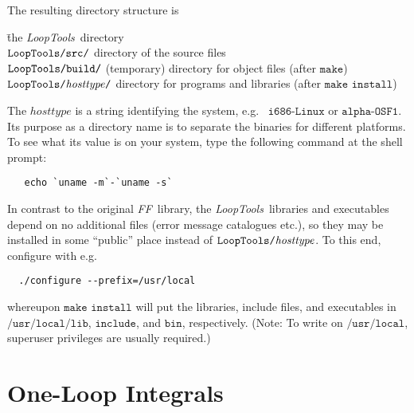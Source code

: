 \documentclass[twoside,12pt]{report}
\def\greyed#1{\special{ps: .7 setgray}#1\special{ps: 0 setgray}}
\def\FF{\textit{FF}}
\def\LT{\textit{LoopTools}}
\def\eg{e.g.\ }
\def\Code#1{\ensuremath{\texttt{#1}}}
\def\Var#1{\ensuremath{\mathit{#1}}}
\begin{document}
\pagebreak

The resulting directory structure is
\begin{tabbing}
\rlap{\Code{LoopTools/}}\hspace{.3\linewidth} \=
	the \LT\ directory \\
\Code{\greyed{LoopTools/}src/} \>
	directory of the source files \\
\Code{\greyed{LoopTools/}build/} \>
	(temporary) directory for object files (after \Code{make}) \\
\Code{\greyed{LoopTools/}\Var{hosttype}/} \>
	directory for programs and libraries (after \Code{make install}) 
\end{tabbing}

%
The \Var{hosttype} is a string identifying the system, \eg 
\Code{i686-Linux} or \Code{alpha-OSF1}.  Its purpose as a directory 
name is to separate the binaries for different platforms.  To see what 
its value is on your system, type the following command at the shell 
prompt:
\begin{verbatim}
   echo `uname -m`-`uname -s`
\end{verbatim}

In contrast to the original \FF\ library, the \LT\ libraries and
executables depend on no additional files (error message catalogues etc.),
so they may be installed in some ``public'' place instead of
\Code{LoopTools/\Var{hosttype}}.  To this end, configure with \eg
\begin{verbatim}
  ./configure --prefix=/usr/local
\end{verbatim}
whereupon \Code{make install} will put the libraries, include files,
and executables in \Code{/usr/local/lib}, \Code{include}, and
\Code{bin}, respectively.  (Note: To write on \Code{/usr/local}, 
superuser privileges are usually required.)


\clearpage

\section{One-Loop Integrals}
\label{sect:loopint}
\end{document}
